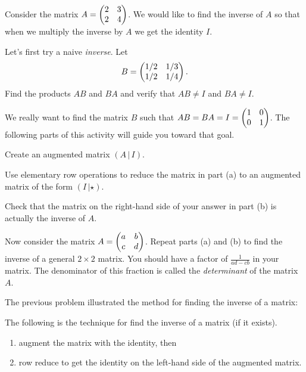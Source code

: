 % 
\begin{problem}
    Consider the matrix $A = \begin{pmatrix} 2 & 3 \\ 2 & 4 \end{pmatrix}$. We would like to find the inverse
    of $A$ so that when we multiply the inverse by $A$ we get the identity $I$.
    \ba
        \item Let's first try a na\:ive {\it inverse}.  Let 
            \[ B = \begin{pmatrix} 1/2 & 1/3 \\ 1/2 & 1/4 \end{pmatrix}. \]
            Find the products $AB$ and $BA$ and verify that $AB \neq I$ and $BA \neq I$.
            
            We really want to find the matrix $B$ such that $AB = BA = I = \begin{pmatrix} 1 & 0 \\ 0
            & 1 \end{pmatrix}$.  The following parts of this activity will guide you toward that
            goal.
        \item Create an augmented matrix $(A \, | \, I)$.
        \item Use elementary row operations to reduce the matrix in part (a) to an
            augmented matrix of the form $(I \, | \star)$.
        \item Check that the matrix on the right-hand side of your answer in part (b) is
            actually the inverse of $A$.
        \item Now consider the matrix $A = \begin{pmatrix} a & b \\ c & d \end{pmatrix}$.  Repeat parts (a)
            and (b) to find the inverse of a general $2 \times 2$ matrix.  You should have
            a factor of $\frac{1}{ad-cb}$ in your matrix.  The denominator of this
            fraction is called the {\it determinant} of the matrix $A$.
    \ea

\end{problem}

The previous problem illustrated the method for finding the inverse of a matrix:
\begin{technique}
    The following is the technique for find the inverse of a matrix (if it exists).
    \begin{enumerate}
        \item augment the matrix with the identity, then
        \item row reduce to get the identity on the left-hand side of the augmented matrix.
    \end{enumerate}
\end{technique}


